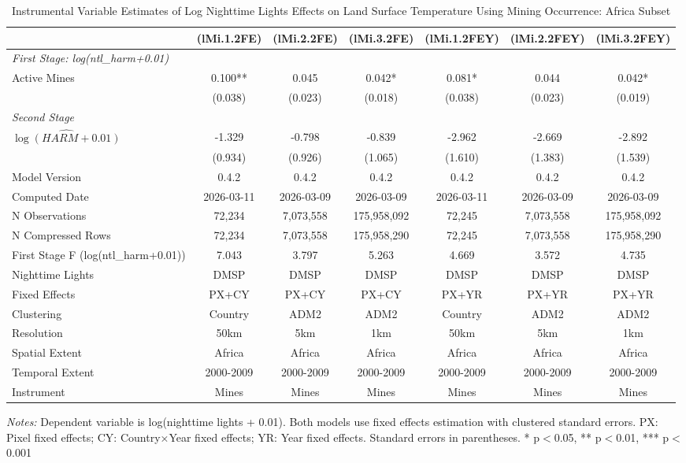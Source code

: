 \begin{table}[htbp]
\centering
\footnotesize
\caption{Instrumental Variable Estimates of Log Nighttime Lights Effects on Land Surface Temperature Using Mining Occurrence: Africa Subset}
\begin{tabular}{lcccccc}
\toprule
 & (lMi.1.2FE) & (lMi.2.2FE) & (lMi.3.2FE) & (lMi.1.2FEY) & (lMi.2.2FEY) & (lMi.3.2FEY) \\
\midrule
\midrule
\multicolumn{7}{l}{\textit{First Stage: log(ntl\_harm+0.01)}} \\
  Active Mines & 0.100** & 0.045 & 0.042* & 0.081* & 0.044 & 0.042* \\
 & (0.038) & (0.023) & (0.018) & (0.038) & (0.023) & (0.019) \\
\midrule
\multicolumn{7}{l}{\textit{Second Stage}} \\
$\hat{\log(HARM + 0.01)}$ & -1.329 & -0.798 & -0.839 & -2.962 & -2.669 & -2.892 \\
 & (0.934) & (0.926) & (1.065) & (1.610) & (1.383) & (1.539) \\
\midrule
Model Version & 0.4.2 & 0.4.2 & 0.4.2 & 0.4.2 & 0.4.2 & 0.4.2 \\
Computed Date & 2026-03-11 & 2026-03-09 & 2026-03-09 & 2026-03-11 & 2026-03-09 & 2026-03-09 \\
N Observations & 72,234 & 7,073,558 & 175,958,092 & 72,245 & 7,073,558 & 175,958,092 \\
N Compressed Rows & 72,234 & 7,073,558 & 175,958,290 & 72,245 & 7,073,558 & 175,958,290 \\
First Stage F (log(ntl\_harm+0.01)) & 7.043 & 3.797 & 5.263 & 4.669 & 3.572 & 4.735 \\
\midrule
Nighttime Lights & DMSP & DMSP & DMSP & DMSP & DMSP & DMSP \\
Fixed Effects & PX+CY & PX+CY & PX+CY & PX+YR & PX+YR & PX+YR \\
Clustering & Country & ADM2 & ADM2 & Country & ADM2 & ADM2 \\
Resolution & 50km & 5km & 1km & 50km & 5km & 1km \\
Spatial Extent & Africa & Africa & Africa & Africa & Africa & Africa \\
Temporal Extent & 2000-2009 & 2000-2009 & 2000-2009 & 2000-2009 & 2000-2009 & 2000-2009 \\
Instrument & Mines & Mines & Mines & Mines & Mines & Mines \\
\bottomrule
\end{tabular}
\begin{threeparttable}
\begin{tablenotes}\small
\item \textit{Notes:} Dependent variable is log(nighttime lights + 0.01). Both models use  fixed effects estimation with clustered standard errors. PX: Pixel fixed effects; CY: Country×Year fixed effects; YR: Year fixed effects. Standard errors in parentheses. * p$<$0.05, ** p$<$0.01, *** p$<$0.001
\end{tablenotes}
\end{threeparttable}
\end{table}